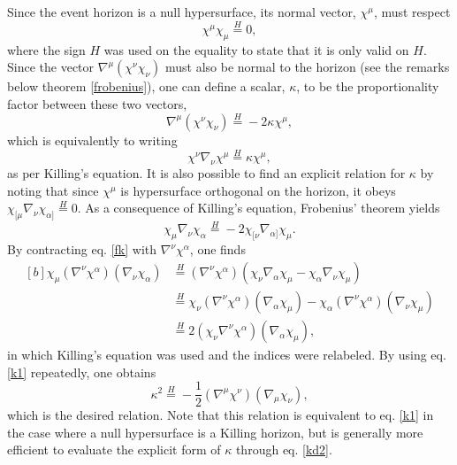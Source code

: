\documentclass[
12pt,		%
openright,	%
twoside,  %
a4paper,			%
chapter=TITLE,		%
english,			%
french,				%
spanish,			%
brazil				%
]{USPSC-classe/USPSC}
\begin{document}
Since the event horizon is a null hypersurface, its normal vector, $\chi^{\mu}$, must respect
\begin{equation}
    \chi^{\mu}\chi_{\mu}\overset{H}{=}0,
\end{equation}
where the sign $H$ was used on the equality to state that it is only valid on $H$.
Since the vector $\nabla^{\mu}(\chi^{\nu}\chi_{\nu})$ must also be normal to the horizon (see the remarks below theorem \ref{frobenius}), one can define a scalar, $\kappa$, to be the proportionality factor between these two vectors,
\begin{equation}\label{k7}
    \nabla^{\mu}(\chi^{\nu}\chi_{\nu})\overset{H}{=}-2\kappa\chi^{\mu},
\end{equation}
which is equivalently to writing
\begin{equation}\label{k1}
    \chi^{\nu}\nabla_{\nu}\chi^{\mu}\overset{H}{=}\kappa\chi^{\mu},
\end{equation}
as per Killing's equation. It is also possible to find an explicit relation for $\kappa$ by noting that since $\chi^{\mu}$ is hypersurface orthogonal on the horizon, it obeys $\chi_{[\mu}\nabla_{\nu}\chi_{\alpha]}\overset{H}{=}0$. As a consequence of Killing's equation, Frobenius' theorem yields 
 \begin{equation}\label{fk}
     \chi_{\mu}\nabla_{\nu}\chi_{\alpha}\overset{H}{=}-2\chi_{[\nu}\nabla_{\alpha]}\chi_{\mu}.
 \end{equation}
By contracting eq. \ref{fk} with $\nabla^{\nu}\chi^{\alpha}$, one finds
 \begin{equation}
 \begin{aligned}[b]
     \chi_{\mu}(\nabla^{\nu}\chi^{\alpha})(\nabla_{\nu}\chi_{\alpha})&\overset{H}{=}(\nabla^{\nu}\chi^{\alpha})(\chi_{\nu}\nabla_{\alpha}\chi_{\mu}-\chi_{\alpha}\nabla_{\nu}\chi_{\mu})\\
     &\overset{H}{=}\chi_{\nu}(\nabla^{\nu}\chi^{\alpha})(\nabla_{\alpha}\chi_{\mu})-\chi_{\alpha}(\nabla^{\nu}\chi^{\alpha})(\nabla_{\nu}\chi_{\mu})\\
     &\overset{H}{=} 2(\chi_{\nu}\nabla^{\nu}\chi^{\alpha})(\nabla_{\alpha}\chi_{\mu}), 
 \end{aligned}
 \end{equation}
 in which Killing's equation was used and the indices were relabeled. By using eq. \ref{k1} repeatedly, one obtains
 \begin{equation}\label{kd2}
     \kappa^2\overset{H}{=}-\frac{1}{2}(\nabla^{\mu}\chi^{\nu})(\nabla_{\mu}\chi_{\nu}),
 \end{equation}
 which is the desired relation. Note that this relation is equivalent to eq. \ref{k1} in the case where a null hypersurface is a Killing horizon, but is generally more efficient to evaluate the explicit form of $\kappa$ through eq. \ref{kd2}. 
\end{document}
